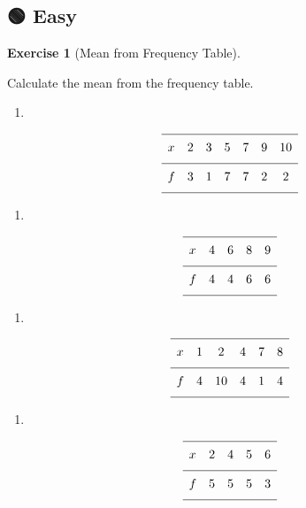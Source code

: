 \documentclass[
  letterpaper,
  DIV=11,
  numbers=noendperiod]{scrreprt}
\providecommand{\tightlist}{%
  \setlength{\itemsep}{0pt}\setlength{\parskip}{0pt}}
\theoremstyle{definition}
\newtheorem{exercise}{Exercise}[chapter]
\theoremstyle{remark}
\begin{document}
\subsection{🟢 Easy}

\begin{exercise}[Mean from Frequency
Table]\protect\hypertarget{exr-freq-1}{}\label{exr-freq-1}

Calculate the mean from the frequency table.

\begin{enumerate}
\def\labelenumi{\alph{enumi})}
\tightlist
\item
\end{enumerate}

\[{\renewcommand{\arraystretch}{1.6}\begin{array}{lcccccc}
\hline x & 2 & 3 & 5 & 7 & 9 & 10 \\[4pt]
\hline f & 3 & 1 & 7 & 7 & 2 & 2 \\[4pt]
\hline
\end{array}}\]

\begin{enumerate}
\def\labelenumi{\alph{enumi})}
\setcounter{enumi}{1}
\tightlist
\item
\end{enumerate}

\[{\renewcommand{\arraystretch}{1.6}\begin{array}{lcccc}
\hline x & 4 & 6 & 8 & 9 \\[4pt]
\hline f & 4 & 4 & 6 & 6 \\[4pt]
\hline
\end{array}}\]

\begin{enumerate}
\def\labelenumi{\alph{enumi})}
\setcounter{enumi}{2}
\tightlist
\item
\end{enumerate}

\[{\renewcommand{\arraystretch}{1.6}\begin{array}{lccccc}
\hline x & 1 & 2 & 4 & 7 & 8 \\[4pt]
\hline f & 4 & 10 & 4 & 1 & 4 \\[4pt]
\hline
\end{array}}\]

\begin{enumerate}
\def\labelenumi{\alph{enumi})}
\setcounter{enumi}{3}
\tightlist
\item
\end{enumerate}

\[{\renewcommand{\arraystretch}{1.6}\begin{array}{lcccc}
\hline x & 2 & 4 & 5 & 6 \\[4pt]
\hline f & 5 & 5 & 5 & 3 \\[4pt]
\hline
\end{array}}\]


\end{exercise}
\end{document}
